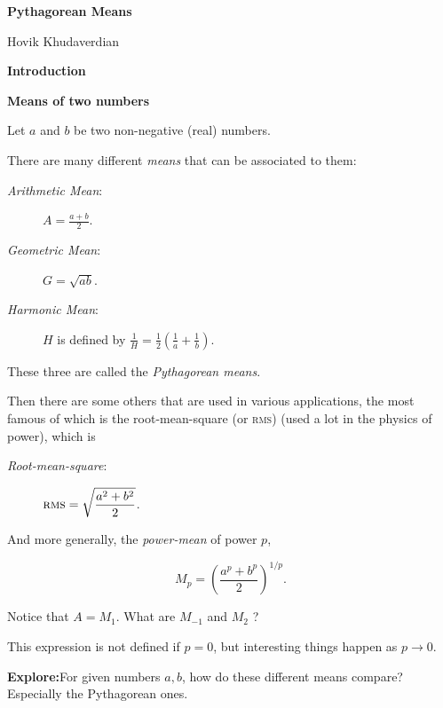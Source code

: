 \documentclass[12pt]{article}
\def\G {G}%
\def\m{\medskip}
\def\b{\bigskip}
\def\RMS{\textsc{rms}}
\begin{document}
\hfill{}

\vskip1cm

 \centerline {\Large\bf Pythagorean Means}
\m
   \centerline {Hovik Khudaverdian}

\b

\centerline{\textbf{Introduction}}

\centerline{\textbf{Means of two numbers}}

\m

Let $a$ and $b$ be two non-negative (real) numbers.

There are many different \emph{means} that can be associated to
them:


\begin{description}

\item[\textit{Arithmetic Mean}:] $A = \displaystyle \frac{a+b}2$.

\item[\textit{Geometric Mean}:] $\G = \sqrt{ab}$.

\item[\textit{Harmonic Mean}:] $H$ is defined by $\displaystyle \frac1H =
\frac12\left(\frac1a + \frac1b\right).$

\end{description}

These three are called the \emph{Pythagorean means}.

Then there are some others that are used in various applications,
the most famous of which is the root-mean-square (or \textsc{rms})
(used a lot in the physics of power), which is

\begin{description}
\item[\textit{Root-mean-square}:] $\displaystyle \RMS = \sqrt{\frac{a^2 + b^2}2}$.
\end{description}


And more generally, the \emph{power-mean} of power $p$,

$$M_p = \left(\frac{a^p + b^p}2\right)^{1/p}.$$

Notice that $A=M_1$. What are $M_{-1}$ and $M_2$ ?

This expression is not defined if $p=0$, but interesting things
happen as $p\to 0$.

\bigskip

\textbf{Explore:}\quad  For given numbers $a,b$, how do these
different means compare?  Especially the Pythagorean ones.


\newpage
\end{document}
